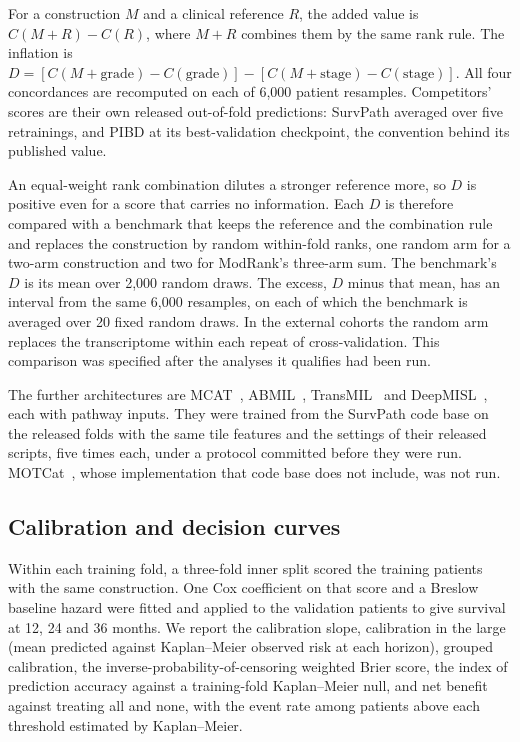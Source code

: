 \documentclass[pdflatex,sn-nature]{sn-jnl}
\begin{document}
For a construction $M$ and a clinical reference $R$, the added value is $C(M+R)-C(R)$, where $M+R$
combines them by the same rank rule. The inflation is $D = [C(M+\text{grade}) - C(\text{grade})] -
[C(M+\text{stage}) - C(\text{stage})]$. All four concordances are recomputed on each of 6,000
patient resamples. Competitors' scores are their own released out-of-fold predictions: SurvPath
averaged over five retrainings, and PIBD at its best-validation checkpoint, the convention behind its
published value.

An equal-weight rank combination dilutes a stronger reference more, so $D$ is positive even for a
score that carries no information. Each $D$ is therefore compared with a benchmark that keeps the
reference and the combination rule and replaces the construction by random within-fold ranks, one
random arm for a two-arm construction and two for ModRank's three-arm sum. The benchmark's $D$ is its
mean over 2,000 random draws. The excess, $D$ minus that mean, has an interval from the same 6,000
resamples, on each of which the benchmark is averaged over 20 fixed random draws. In the external
cohorts the random arm replaces the transcriptome within each repeat of cross-validation. This
comparison was specified after the analyses it qualifies had been run.

The further architectures are MCAT~\citep{chen2021mcat}, ABMIL~\citep{ilse2018abmil},
TransMIL~\citep{shao2021transmil} and DeepMISL~\citep{yao2020deepattnmisl}, each with pathway
inputs. They were trained from the SurvPath code base on the released folds with the same tile
features and the settings of their released scripts, five times each, under a protocol committed
before they were run. MOTCat~\citep{xu2023motcat},
whose implementation that code base does not include, was not run.

\subsection*{Calibration and decision curves}

Within each training fold, a three-fold inner split scored the training patients with the same
construction. One Cox coefficient on that score and a Breslow baseline hazard were fitted and applied
to the validation patients to give survival at 12, 24 and 36 months. We report the calibration slope,
calibration in the large (mean predicted against Kaplan--Meier observed risk at each horizon),
grouped calibration, the inverse-probability-of-censoring weighted Brier score, the index of
prediction accuracy against a training-fold Kaplan--Meier null, and net benefit against treating all
and none, with the event rate among patients above each threshold estimated by Kaplan--Meier.
\end{document}
